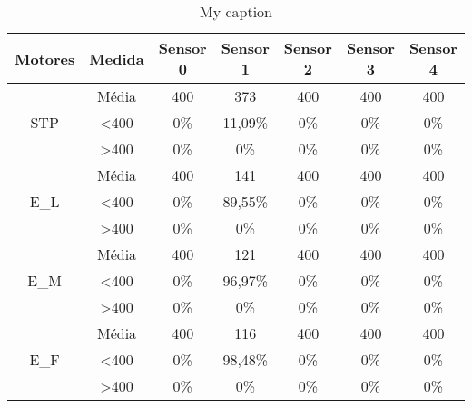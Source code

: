 \begin{table}[]
\centering
\caption{My caption}
\label{my-label}
\begin{tabular}{|c|c|ccccc|}
\hline
\textbf{Motores}                & \textbf{Medida}  & \textbf{Sensor 0} & \textbf{Sensor 1} & \textbf{Sensor 2} & \textbf{Sensor 3} & \textbf{Sensor 4} \\ \hline
\multirow{3}{*}{STP}            & Média            & 400               & 373               & 400               & 400               & 400               \\
                                & \textless 400    & 0\%            & 11,09\%           & 0\%            & 0\%            & 0\%            \\
                                & \textgreater 400 & 0\%            & 0\%            & 0\%            & 0\%            & 0\%            \\ \hline
\multirow{3}{*}{E\_L}           & Média            & 400               & 141               & 400               & 400               & 400               \\
                                & \textless 400    & 0\%            & 89,55\%           & 0\%            & 0\%            & 0\%            \\
                                & \textgreater 400 & 0\%            & 0\%            & 0\%            & 0\%            & 0\%            \\ \hline
\multirow{3}{*}{E\_M}           & Média            & 400               & 121               & 400               & 400               & 400               \\
                                & \textless 400    & 0\%            & 96,97\%           & 0\%            & 0\%            & 0\%            \\
                                & \textgreater 400 & 0\%            & 0\%            & 0\%            & 0\%            & 0\%            \\ \hline
\multirow{3}{*}{E\_F}           & Média            & 400               & 116               & 400               & 400               & 400               \\
                                & \textless 400    & 0\%            & 98,48\%           & 0\%            & 0\%            & 0\%            \\
                                & \textgreater 400 & 0\%            & 0\%            & 0\%            & 0\%            & 0\%            \\ \hline

\end{tabular}
\end{table}
